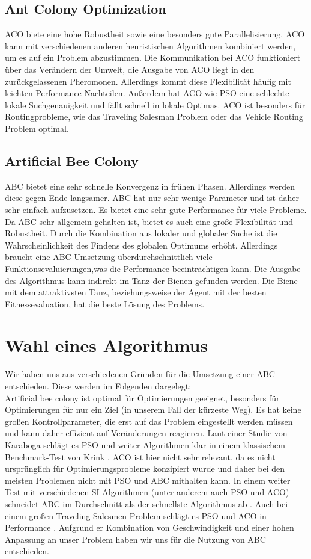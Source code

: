 \subsection{Ant Colony Optimization}
ACO biete eine hohe Robustheit sowie eine besonders gute Parallelisierung.  ACO kann mit verschiedenen anderen heuristischen Algorithmen kombiniert werden, um es auf ein Problem abzustimmen. Die Kommunikation bei ACO funktioniert über das Verändern der Umwelt, die Ausgabe von ACO liegt in den zurückgelassenen Pheromonen. Allerdings kommt diese Flexibilität häufig mit leichten Performance-Nachteilen. Außerdem hat ACO wie PSO eine schlechte lokale Suchgenauigkeit und fällt schnell in lokale Optimas. ACO ist besonders für Routingprobleme, wie das Traveling Salesman Problem \cite{stutzle1997max} oder das Vehicle Routing Problem \cite{gambardella1999macs} optimal.

\subsection{Artificial Bee Colony}
ABC bietet eine sehr schnelle Konvergenz in frühen Phasen. Allerdings werden diese gegen Ende langsamer.  ABC hat nur sehr wenige Parameter und ist daher sehr einfach aufzusetzen. Es bietet eine sehr gute Performance für viele Probleme. Da ABC sehr allgemein gehalten ist, bietet es auch eine große Flexibilität und Robustheit. Durch die Kombination aus lokaler und globaler Suche ist die Wahrscheinlichkeit des Findens des globalen Optimums erhöht. Allerdings braucht eine ABC-Umsetzung überdurchschnittlich viele Funktionsevaluierungen,was die Performance beeinträchtigen kann. Die Ausgabe des Algorithmus kann indirekt im Tanz der Bienen gefunden werden. Die Biene mit dem attraktivsten Tanz, beziehungsweise der Agent mit der besten Fitnessevaluation, hat die beste Lösung des Problems.

\section{Wahl eines Algorithmus}
Wir haben uns aus verschiedenen Gründen für die Umsetzung einer ABC entschieden. Diese werden im Folgenden dargelegt:\\
 Artificial bee colony ist optimal für Optimierungen geeignet, besonders für Optimierungen für nur ein Ziel (in unserem Fall der kürzeste Weg). Es hat keine großen Kontrollparameter, die erst auf das Problem eingestellt werden müssen und kann daher effizient auf Veränderungen reagieren. Laut einer Studie von Karaboga \cite{karaboga2008performance} schlägt es PSO und weiter Algorithmen klar in einem klassischem Benchmark-Test von Krink \cite{krink2004noisy}. ACO ist hier nicht sehr relevant, da es nicht ursprünglich für Optimierungsprobleme konzipiert wurde und daher bei den meisten Problemen nicht mit PSO und ABC mithalten kann. In einem weiter Test mit verschiedenen SI-Algorithmen (unter anderem auch PSO und ACO) schneidet ABC im Durchschnitt als der schnellste Algorithmus ab \cite{ab2015comprehensive}. Auch bei einem großen Traveling Salesmen Problem schlägt es PSO und ACO in Performance \cite{sabet2016comparison}.
Aufgrund er Kombination von Geschwindigkeit und einer hohen Anpassung an unser Problem haben wir uns für die Nutzung von ABC entschieden.
